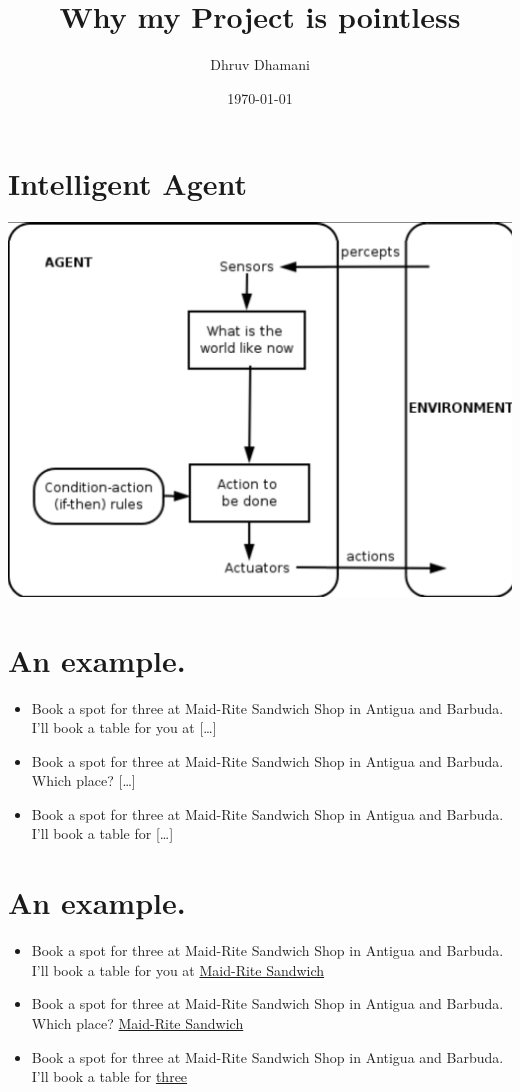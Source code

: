 \documentclass[11pt]{article}
\author{Dhruv Dhamani}
\date{\today}
\title{Why my Project is pointless}
\begin{document}
\maketitle

\section{Intelligent Agent}
\label{sec:orgcdc4f13}
\begin{center}
\includegraphics[width=.9\linewidth]{./ia.png}
\end{center}

\section{An example.}
\label{sec:org526a7c3}

\begin{itemize}
\item Book a spot for three at Maid-Rite Sandwich Shop in Antigua and Barbuda. I'll
book a table for you at [\ldots{}]
\item Book a spot for three at Maid-Rite Sandwich Shop in Antigua and Barbuda. Which
place? [\ldots{}]
\item Book a spot for three at Maid-Rite Sandwich Shop in Antigua and Barbuda. I'll
book a table for [\ldots{}]
\end{itemize}

\section{An example.}
\label{sec:orgcf6e38d}

\begin{itemize}
\item Book a spot for three at Maid-Rite Sandwich Shop in Antigua and Barbuda. I'll
book a table for you at \uline{Maid-Rite Sandwich}
\item Book a spot for three at Maid-Rite Sandwich Shop in Antigua and Barbuda. Which
place? \uline{Maid-Rite Sandwich}
\item Book a spot for three at Maid-Rite Sandwich Shop in Antigua and Barbuda. I'll
book a table for \uline{three}
\end{itemize}
\end{document}
